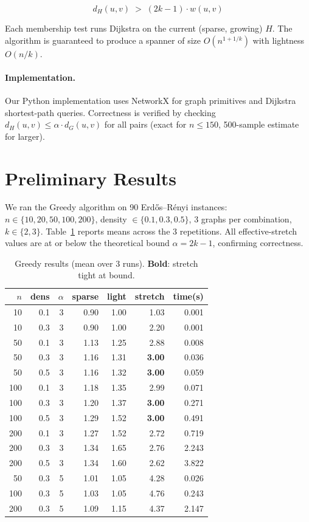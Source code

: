 \documentclass[11pt,letterpaper,twocolumn]{article}
\begin{document}
\begin{equation}
d_H(u,v) \;>\; (2k-1)\cdot w(u,v)
\end{equation}

Each membership test runs Dijkstra on the current (sparse, growing) $H$.
The algorithm is guaranteed to produce a spanner of size
$O(n^{1+1/k})$ with lightness $O(n/k)$.

\paragraph{Implementation.}
Our Python implementation uses NetworkX for graph primitives and
Dijkstra shortest-path queries.
Correctness is verified by checking $d_H(u,v) \leq \alpha \cdot d_G(u,v)$
for all pairs (exact for $n \leq 150$, 500-sample estimate for larger).

\section{Preliminary Results}

We ran the Greedy algorithm on 90 Erd\H{o}s--R\'enyi instances:
$n \in \{10,20,50,100,200\}$, density $\in \{0.1, 0.3, 0.5\}$,
3 graphs per combination, $k \in \{2,3\}$.
Table~\ref{tab:results} reports means across the 3 repetitions.
All effective-stretch values are at or below the theoretical bound
$\alpha = 2k-1$, confirming correctness.

\begin{table}[t]
\centering
\small
\setlength{\tabcolsep}{3pt}
\begin{tabular}{r r r r r r r}
\toprule
$n$ & dens & $\alpha$ & sparse & light & stretch & time(s) \\
\midrule
 10 & 0.1 & 3 & 0.90 & 1.00 & 1.03 & 0.001 \\
 10 & 0.3 & 3 & 0.90 & 1.00 & 2.20 & 0.001 \\
 50 & 0.1 & 3 & 1.13 & 1.25 & 2.88 & 0.008 \\
 50 & 0.3 & 3 & 1.16 & 1.31 & \textbf{3.00} & 0.036 \\
 50 & 0.5 & 3 & 1.16 & 1.32 & \textbf{3.00} & 0.059 \\
100 & 0.1 & 3 & 1.18 & 1.35 & 2.99 & 0.071 \\
100 & 0.3 & 3 & 1.20 & 1.37 & \textbf{3.00} & 0.271 \\
100 & 0.5 & 3 & 1.29 & 1.52 & \textbf{3.00} & 0.491 \\
200 & 0.1 & 3 & 1.27 & 1.52 & 2.72 & 0.719 \\
200 & 0.3 & 3 & 1.34 & 1.65 & 2.76 & 2.243 \\
200 & 0.5 & 3 & 1.34 & 1.60 & 2.62 & 3.822 \\
\midrule
 50 & 0.3 & 5 & 1.01 & 1.05 & 4.28 & 0.026 \\
100 & 0.3 & 5 & 1.03 & 1.05 & 4.76 & 0.243 \\
200 & 0.3 & 5 & 1.09 & 1.15 & 4.37 & 2.147 \\
\bottomrule
\end{tabular}
\caption{Greedy results (mean over 3 runs). \textbf{Bold}: stretch tight at bound.}
\label{tab:results}
\end{table}
\end{document}
